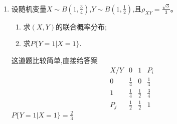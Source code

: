 \documentclass[12pt, a4paper, oneside, UTF8]{ctexbook}
\begin{document}
\begin{enumerate}[label=\arabic*.,start=13]
    \item  设随机变量$X\sim B\left(1,\frac{3}{4}\right)$,$Y\sim B\left(1,\frac{1}{2}\right)$,且$\rho_{XY}=\frac{\sqrt{3}}{3}$。
    \begin{enumerate}
        \item 求$(X,Y)$的联合概率分布;
        \item 求$P\{Y=1|X=1\}$.
    \end{enumerate}
    
    \begin{solution}
    这道题比较简单,直接给答案
    \[
    \begin{array}{c|c|c|c}
        X/Y & 0 & 1 & P_i \\
        \hline
        0 & \frac{1}{4} & 0 &\frac{1}{4} \\
        \hline
        1 & \frac{1}{4} & \frac{1}{2} & \frac{3}{4} \\
        \hline
        P_j& \frac{1}{2} & \frac{1}{2} & 1
    \end{array}
    \]
    $P\{Y=1|X=1\}=\frac{2}{3}$
    \end{solution}
\end{enumerate}
\end{document}
